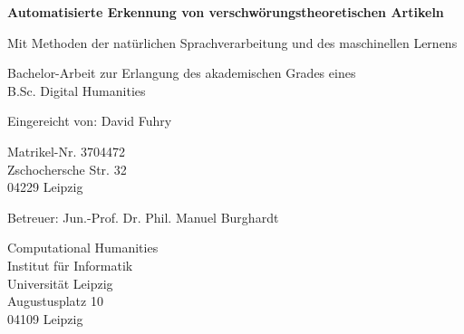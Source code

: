 \documentclass[a4paper]{article}
\begin{document}
\begin{titlepage}
    \begin{center}
        \vspace*{1cm}

        \textbf{\Large Automatisierte Erkennung von verschwörungstheoretischen Artikeln}

        \vspace{0.5cm}
        Mit Methoden der natürlichen Sprachverarbeitung und des maschinellen Lernens
                
        \vspace{1.5cm}


        \vfill
                
        Bachelor-Arbeit zur Erlangung des akademischen Grades eines\\
        B.Sc. Digital Humanities

        \vspace{3cm}
                
        Eingereicht von: David Fuhry
        
        \vspace{0.2cm}

        Matrikel-Nr. 3704472\\
        Zschochersche Str. 32\\
        04229 Leipzig

        \vspace{1cm}

        Betreuer: Jun.-Prof. Dr. Phil. Manuel Burghardt
        
        \vspace{0.2cm}
                    
        Computational Humanities\\
        Institut für Informatik\\
        Universität Leipzig\\
        Augustusplatz 10\\
        04109 Leipzig 
                
    \end{center}
\end{titlepage}

\tableofcontents

\thispagestyle{empty}

\newpage




\end{document}

